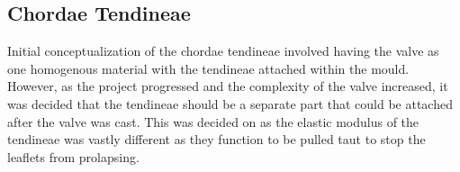 
\subsection{Chordae Tendineae}\label{sec:Chord}
Initial conceptualization of the chordae tendineae involved having the valve as one homogenous material with the tendineae attached within the mould. However, as the project progressed and the complexity of the valve increased, it was decided that the tendineae should be a separate part that could be attached after the valve was cast. This was decided on as the elastic modulus of the tendineae was vastly different as they function to be pulled taut to stop the leaflets from prolapsing.

